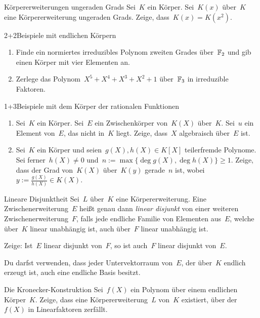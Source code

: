 \documentclass{algblatt}
\begin{document}

\begin{aufgabe}{4}{Körpererweiterungen ungeraden Grads}
Sei~$K$ ein Körper. Sei~$K(x)$ über~$K$ eine Körpererweiterung ungeraden Grads. Zeige,
dass~$K(x) = K(x^2)$.
\end{aufgabe}

\begin{aufgabe}{2+2}{Beispiele mit endlichen Körpern}
\begin{enumerate}
\item
Finde ein normiertes irreduzibles Polynom zweiten Grades über~$\mathbb{F}_2$ und gib
einen Körper mit vier Elementen an.
\item Zerlege das Polynom~$X^5 + X^4 + X^3 + X^2 + 1$ über~$\mathbb{F}_3$ in
irreduzible Faktoren.
\end{enumerate}
\end{aufgabe}

\begin{aufgabe}{1+3}{Beispiele mit dem Körper der rationalen Funktionen}
\begin{enumerate}
\item Sei~$K$ ein Körper. Sei~$E$ ein Zwischenkörper von~$K(X)$ über~$K$.
Sei~$u$ ein Element von~$E$, das nicht in~$K$ liegt. Zeige, dass~$X$
algebraisch über~$E$ ist.
\item Sei~$K$ ein Körper und seien~$g(X), h(X) \in K[X]$ teilerfremde Polynome.
Sei ferner~$h(X) \neq 0$ und~$n := \max\{ \deg g(X), \deg h(X) \} \geq 1$.
Zeige, dass der Grad von~$K(X)$ über~$K(y)$ gerade~$n$ ist, wobei~$y :=
\tfrac{g(X)}{h(X)} \in K(X)$.
\end{enumerate}
\end{aufgabe}

\begin{aufgabe}{4}{Lineare Disjunktheit}
Sei~$L$ über~$K$ eine Körpererweiterung. Eine Zwischenerweiterung~$E$ heißt
genau dann \emph{linear disjunkt} von einer weiteren Zwischenerweiterung~$F$,
falls jede endliche Familie von Elementen aus~$E$, welche über~$K$ linear
unabhängig ist, auch über~$F$ linear unabhängig ist.

Zeige: Ist~$E$ linear disjunkt von~$F$, so ist auch~$F$ linear disjunkt von~$E$.

Du darfst verwenden, dass jeder Untervektorraum von~$E$, der über~$K$ endlich
erzeugt ist, auch eine endliche Basis besitzt.
\end{aufgabe}

\begin{aufgabe}{4}{Die Kronecker-Konstruktion}
Sei~$f(X)$ ein Polynom über einem endlichen Körper~$K$. Zeige, dass eine
Kör\-per\-erwei\-te\-rung~$L$ von~$K$ existiert, über der~$f(X)$ in Linearfaktoren
zerfällt.
\end{aufgabe}
\end{document}
